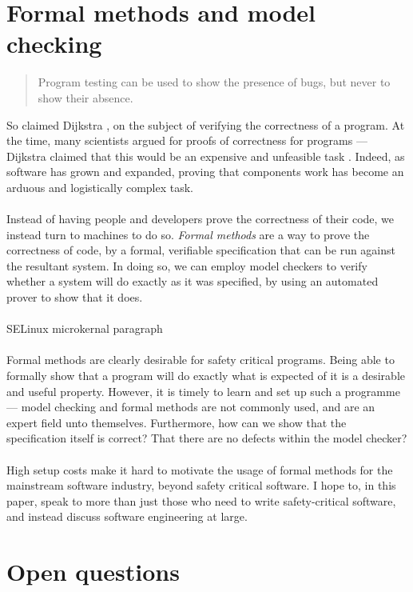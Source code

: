 \section{Formal methods and model checking} \label{sec:otherdets:modelCheck}

\begin{quote}
Program testing can be used to show the presence of bugs, but never to show their absence.
\end{quote}

So claimed Dijkstra \FIXME, on the subject of verifying the correctness of a program.
At the time, many scientists argued for proofs of correctness for programs --- Dijkstra claimed that
this would be an expensive and unfeasible task \FIXME.
Indeed, as software has grown and expanded, proving that components work has become an arduous and
logistically complex task.\\
\\
Instead of having people and developers prove the correctness of their code, we instead turn to
machines to do so.
{\em Formal methods} are a way to prove the correctness of code, by a formal, verifiable
specification that can be run against the resultant system.
In doing so, we can employ model checkers to verify whether a system will do exactly as it was
specified, by using an automated prover to show that it does.\\
\\
\FIXME SELinux microkernal paragraph\\
\\
Formal methods are clearly desirable for safety critical programs.
Being able to formally show that a program will do exactly what is expected of it is a desirable and
useful property.
However, it is timely to learn and set up such a programme --- model checking and formal methods are
not commonly used, and are an expert field unto themselves.
Furthermore, how can we show that the specification itself is correct?
That there are no defects within the model checker?\\
\\
High setup costs make it hard to motivate the usage of formal methods for the mainstream software
industry, beyond safety critical software.
I hope to, in this paper, speak to more than just those who need to write safety-critical software,
and instead discuss software engineering at large.

\section{Open questions}

